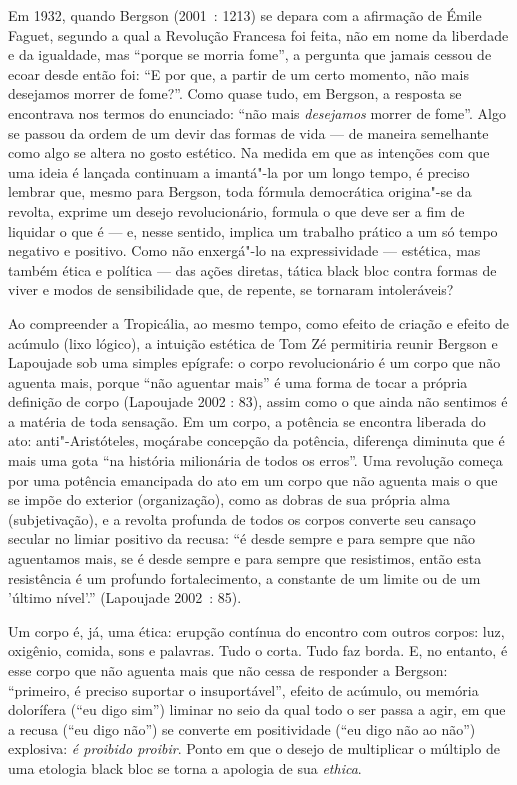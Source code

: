 Em 1932, quando Bergson (2001~: 1213) se depara com a afirmação de Émile
Faguet, segundo a qual a Revolução Francesa foi feita, não em nome da
liberdade e da igualdade, mas ``porque se morria fome'', a pergunta que
jamais cessou de ecoar desde então foi: ``E por que, a partir de um
certo momento, não mais desejamos morrer de fome?''. Como quase tudo, em
Bergson, a resposta se encontrava nos termos do enunciado: ``não mais
\emph{desejamos }morrer de fome''. Algo se passou da ordem de um devir
das formas de vida --- de maneira semelhante como algo se altera no gosto
estético. Na medida em que as intenções com que uma ideia é lançada
continuam a imantá"-la por um longo tempo, é preciso lembrar que, mesmo
para Bergson, toda fórmula democrática origina"-se da revolta, exprime um
desejo revolucionário, formula o que deve ser a fim de liquidar o que é
--- e, nesse sentido, implica um trabalho prático a um só tempo negativo
e positivo. Como não enxergá"-lo na expressividade --- estética, mas
também ética e política --- das ações diretas, tática black bloc contra
formas de viver e modos de sensibilidade que, de repente, se tornaram
intoleráveis?

Ao compreender a Tropicália, ao mesmo tempo, como efeito de criação e
efeito de acúmulo (lixo lógico), a intuição estética de Tom Zé
permitiria reunir Bergson e Lapoujade sob uma simples epígrafe: o corpo
revolucionário é um corpo que não aguenta mais, porque ``não aguentar
mais'' é uma forma de tocar a própria definição de corpo (Lapoujade 2002
: 83), assim como o que ainda não sentimos é a matéria de toda sensação.
Em um corpo, a potência se encontra liberada do ato: anti"-Aristóteles,
moçárabe concepção da potência, diferença diminuta que é mais uma gota
``na história milionária de todos os erros''. Uma revolução começa por
uma potência emancipada do ato em um corpo que não aguenta mais o que se
impõe do exterior (organização), como as dobras de sua própria alma
(subjetivação), e a revolta profunda de todos os corpos converte seu
cansaço secular no limiar positivo da recusa: ``é desde sempre e para
sempre que não aguentamos mais, se é desde sempre e para sempre que
resistimos, então esta resistência é um profundo fortalecimento, a
constante de um limite ou de um 'último nível'.'' (Lapoujade 2002~: 85).

Um corpo é, já, uma ética: erupção contínua do encontro com outros
corpos: luz, oxigênio, comida, sons e palavras. Tudo o corta. Tudo faz
borda. E, no entanto, é esse corpo que não aguenta mais que não cessa de
responder a Bergson: ``primeiro, é preciso suportar o insuportável'',
efeito de acúmulo, ou memória dolorífera (``eu digo sim'') liminar no
seio da qual todo o ser passa a agir, em que a recusa (``eu digo não'')
se converte em positividade (``eu digo não ao não'') explosiva: \emph{é
proibido proibir}. Ponto em que o desejo de multiplicar o múltiplo de
uma etologia black bloc se torna a apologia de sua \emph{ethica}.

